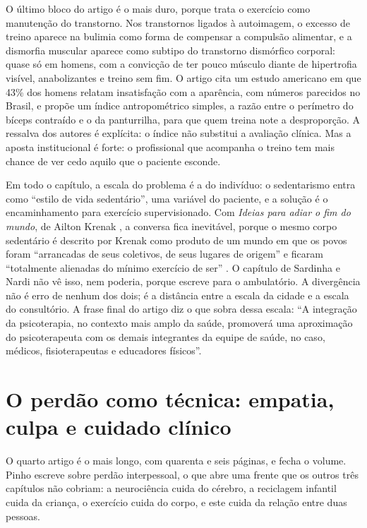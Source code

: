\documentclass[12pt]{article}
\begin{document}
O último bloco do artigo é o mais duro, porque trata o exercício como manutenção do transtorno. Nos transtornos ligados à autoimagem, o excesso de treino aparece na bulimia como forma de compensar a compulsão alimentar, e a dismorfia muscular aparece como subtipo do transtorno dismórfico corporal: quase só em homens, com a convicção de ter pouco músculo diante de hipertrofia visível, anabolizantes e treino sem fim. O artigo cita um estudo americano em que 43\% dos homens relatam insatisfação com a aparência, com números parecidos no Brasil, e propõe um índice antropométrico simples, a razão entre o perímetro do bíceps contraído e o da panturrilha, para que quem treina note a desproporção. A ressalva dos autores é explícita: o índice não substitui a avaliação clínica. Mas a aposta institucional é forte: o profissional que acompanha o treino tem mais chance de ver cedo aquilo que o paciente esconde.

Em todo o capítulo, a escala do problema é a do indivíduo: o sedentarismo entra como ``estilo de vida sedentário'', uma variável do paciente, e a solução é o encaminhamento para exercício supervisionado. Com \emph{Ideias para adiar o fim do mundo}, de Ailton Krenak \cite{krenak2019}, a conversa fica inevitável, porque o mesmo corpo sedentário é descrito por Krenak como produto de um mundo em que os povos foram ``arrancadas de seus coletivos, de seus lugares de origem'' e ficaram ``totalmente alienadas do mínimo exercício de ser'' \cite[p. 14]{krenak2019}. O capítulo de Sardinha e Nardi não vê isso, nem poderia, porque escreve para o ambulatório. A divergência não é erro de nenhum dos dois; é a distância entre a escala da cidade e a escala do consultório. A frase final do artigo diz o que sobra dessa escala: ``A integração da psicoterapia, no contexto mais amplo da saúde, promoverá uma aproximação do psicoterapeuta com os demais integrantes da equipe de saúde, no caso, médicos, fisioterapeutas e educadores físicos''.

\section{O perdão como técnica: empatia, culpa e cuidado clínico}

O quarto artigo é o mais longo, com quarenta e seis páginas, e fecha o volume. Pinho escreve sobre perdão interpessoal, o que abre uma frente que os outros três capítulos não cobriam: a neurociência cuida do cérebro, a reciclagem infantil cuida da criança, o exercício cuida do corpo, e este cuida da relação entre duas pessoas.
\end{document}
